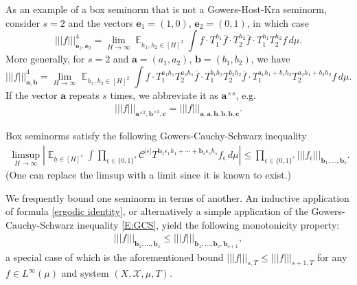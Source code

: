 \documentclass[11pt]{amsart}
\theoremstyle{definition}
\newcommand{\CC}{{\mathcal C}}
\newcommand{\CX}{{\mathcal X}}
\newcommand{\ba}{{\mathbf{a}}}
\newcommand{\bc}{{\mathbf{c}}}
\newcommand{\be}{{\mathbf{e}}}
\renewcommand{\b}{{\textbf{b}}}
\newcommand{\uh}{{\underline{h}}}
\newcommand{\eps}{\epsilon}
\newcommand{\ueps}{{\underline{\epsilon}}}
\newcommand{\nnorm}[1]{\lvert\!|\!| #1|\!|\!\rvert}
\DeclareMathOperator*{\E}{\mathbb{E}}
\newcommand{\abs}[1]{\mathopen{}\left| #1\mathclose{}\right|}
\begin{document}
As an example of a box seminorm that  is not a Gowers-Host-Kra seminorm, consider $s=2$ and the vectors $\be_1=(1,0)$, $\be_2=(0,1)$, in which case
$$
\nnorm{f}_{{\be_1},{\be_2}}^4 = \lim_{H\to\infty}\E_{h_1, h_2\in [H]^2}\int f\cdot T_1^{h_1}\overline{f}\cdot T_2^{h_2}\overline{f}\cdot T_1^{h_1}T_2^{h_2}f\, d\mu.
$$
More generally, for  $s=2$ and $\ba=(a_1,a_2)$, $\b=(b_1,b_2)$, we have
$$
\nnorm{f}_{{\ba},{\b}}^4=\lim_{H\to\infty}\E_{h_1, h_2\in [H]^2}\int f\cdot T_1^{a_1h_1}T_2^{a_2h_1}\overline{f}\cdot T_1^{b_1h_2}T_2^{b_2h_2}\overline{f}\cdot T_1^{a_1h_1+b_1h_2}T_2^{a_2h_1+b_2h_2}f\, d\mu.
$$
If the vector $\ba$ repeats $s$ times, we abbreviate it as $\ba^{\times s}$, e.g.
\begin{align*}
    \nnorm{f}_{\ba^{\times 2}, \b^{\times 3}, \bc}=\nnorm{f}_{\ba, \ba, \b, \b, \b, \bc}.
\end{align*}




Box seminorms satisfy the following Gowers-Cauchy-Schwarz inequality  \cite[Proposition~2]{Ho09}
\begin{align}\label{E:GCS}
    \limsup_{H\to\infty}\abs{\E_{\uh\in[H]^s}\int \prod_{\ueps\in\{0,1\}^s} \CC^{|\ueps|} T^{\b_1 \eps_1 h_1 + \cdots + \b_s \eps_s h_s}f_\ueps\, d\mu}\leq \prod_{\ueps\in\{0,1\}^s}\nnorm{f_\ueps}_{\b_1, \ldots, \b_s}.
\end{align}
(One can replace the limsup with a limit since it is known to exist.)

We frequently bound one seminorm in terms of another. An inductive application of formula \eqref{ergodic identity}, or alternatively a simple application of the Gowers-Cauchy-Schwarz inequality \eqref{E:GCS}, yield the following monotonicity property:
\begin{align*}%
    \nnorm{f}_{\b_1, \ldots, \b_s}\leq \nnorm{f}_{\b_1, \ldots,\b_s,  \b_{s+1}},
\end{align*}
a special case of which is the aforementioned bound $\nnorm{f}_{s,T}\leq \nnorm{f}_{s+1, T}$ for any $f\in L^\infty(\mu)$ and system $(X, \CX, \mu, T)$.
\end{document}
